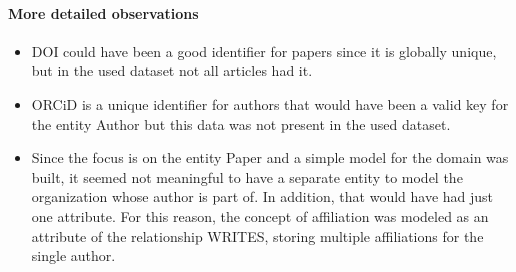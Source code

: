 \paragraph{More detailed observations}
\begin{itemize}
    \item DOI could have been a good identifier for papers since it is globally unique, but in the used dataset not all articles had it.
    \item ORCiD is a unique identifier for authors that would have been a valid key for the entity Author but this data was not present in the used dataset.
    \item Since the focus is on the entity Paper and a simple model for the domain was built, it seemed not meaningful to have a separate entity to model the organization whose author is part of.
    In addition, that would have had just one attribute.
    For this reason, the concept of affiliation was modeled as an attribute of the relationship WRITES, storing multiple affiliations for the single author.
\end{itemize}
